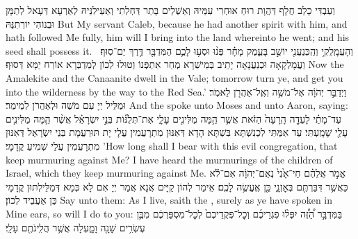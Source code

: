{וְעַבְדִּי כָלֵב חֲלָף דַּהֲוָת רוּחַ אוּחְרִי עִמֵּיהּ וְאַשְׁלֵים בָּתַר דַּחְלְתִי וְאַעֵילִנֵּיהּ לְאַרְעָא דְּעָאל לְתַמָּן וּבְנוֹהִי יוֹרְתִנַּהּ}
{But My servant Caleb, because he had another spirit with him, and hath followed Me fully, him will I bring into the land whereinto he went; and his seed shall possess it.}{}
{וְהָעֲמָֽלֵקִ֥י וְהַֽכְּנַעֲנִ֖י יוֹשֵׁ֣ב בָּעֵ֑מֶק מָחָ֗ר פְּנ֨וּ וּסְע֥וּ לָכֶ֛ם הַמִּדְבָּ֖ר דֶּ֥רֶךְ יַם־סֽוּף׃ \petucha 
{}}
{וַעֲמָלְקָאָה וּכְנַעֲנָאָה יָתֵיב בְּמֵישְׁרָא מְחַר אִתְפְּנוֹ וְטוּלוּ לְכוֹן לְמַדְבְּרָא אוֹרַח יַמָּא דְּסוּף׃}
{Now the Amalekite and the Canaanite dwell in the Vale; tomorrow turn ye, and get you into the wilderness by the way to the Red Sea.’}{}
{וַיְדַבֵּ֣ר יְהֹוָ֔ה אֶל־מֹשֶׁ֥ה וְאֶֽל־אַהֲרֹ֖ן לֵאמֹֽר׃}
{וּמַלֵּיל יְיָ עִם מֹשֶׁה וּלְאַהֲרֹן לְמֵימַר׃}
{And the \lord\space spoke unto Moses and unto Aaron, saying:}{}
{עַד־מָתַ֗י לָעֵדָ֤ה הָֽרָעָה֙ הַזֹּ֔את אֲשֶׁ֛ר הֵ֥מָּה מַלִּינִ֖ים עָלָ֑י אֶת־תְּלֻנּ֞וֹת בְּנֵ֣י יִשְׂרָאֵ֗ל אֲשֶׁ֨ר הֵ֧מָּה מַלִּינִ֛ים עָלַ֖י שָׁמָֽעְתִּי׃
}
{עַד אִמַּתִּי לִכְנִשְׁתָּא בִּשְׁתָּא הָדָא דְּאִנּוּן מִתְרָעֲמִין עֲלָי יָת תּוּרְעֲמָת בְּנֵי יִשְׂרָאֵל דְּאִנּוּן מִתְרָעֲמִין עֲלַי שְׁמִיעַ קֳדָמָי׃}
{’How long shall I bear with this evil congregation, that keep murmuring against Me? I have heard the murmurings of the children of Israel, which they keep murmuring against Me.}{}
{אֱמֹ֣ר אֲלֵהֶ֗ם חַי־אָ֙נִי֙ נְאֻם־יְהֹוָ֔ה אִם־לֹ֕א כַּאֲשֶׁ֥ר דִּבַּרְתֶּ֖ם בְּאׇזְנָ֑י כֵּ֖ן אֶֽעֱשֶׂ֥ה לָכֶֽם׃
}
{אֵימַר לְהוֹן קַיָּים אֲנָא אֲמַר יְיָ אִם לָא כְּמָא דְּמַלֵּילְתּוּן קֳדָמָי כֵּן אַעֲבֵיד לְכוֹן׃}
{Say unto them: As I live, saith the \lord, surely as ye have spoken in Mine ears, so will I do to you:}{}
{בַּמִּדְבָּ֣ר הַ֠זֶּ֠ה יִפְּל֨וּ פִגְרֵיכֶ֜ם וְכׇל־פְּקֻדֵיכֶם֙ לְכׇל־מִסְפַּרְכֶ֔ם מִבֶּ֛ן עֶשְׂרִ֥ים שָׁנָ֖ה וָמָ֑עְלָה אֲשֶׁ֥ר הֲלִֽינֹתֶ֖ם עָלָֽי׃
}
